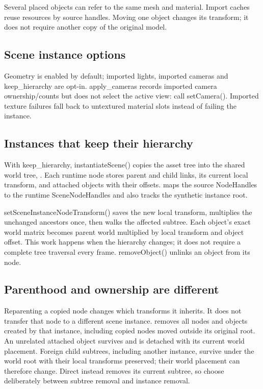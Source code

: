 \documentclass[11pt,a4paper]{article}
\begin{document}
Several placed objects can refer to the same mesh and material. Import caches reuse resources by source handles. Moving one object changes its transform; it does not require another copy of the original model.

\subsection*{Scene instance options}
Geometry is enabled by default; imported lights, imported cameras and keep\_hierarchy are opt-in. apply\_cameras records imported camera ownership/counts but does not select the active view: call setCamera(). Imported texture failures fall back to untextured material slots instead of failing the instance.

\subsection*{Instances that keep their hierarchy}
With keep\_hierarchy, instantiateScene() copies the asset tree into the shared world tree, . Each runtime node stores parent and child links, its current local transform, and attached objects with their offsets.  maps the source NodeHandles to the runtime SceneNodeHandles and also tracks the synthetic instance root.

setSceneInstanceNodeTransform() saves the new local transform, multiplies the unchanged ancestors once, then walks the affected subtree. Each object's exact world matrix becomes parent world multiplied by local transform and object offset. This work happens when the hierarchy changes; it does not require a complete tree traversal every frame. removeObject() unlinks an object from its node.

\clearpage
\subsection*{Parenthood and ownership are different}
Reparenting a copied node changes which transforms it inherits. It does not transfer that node to a different scene instance.  removes all nodes and objects created by that instance, including copied nodes moved outside its original root. An unrelated attached object survives and is detached with its current world placement. Foreign child subtrees, including another instance, survive under the world root with their local transforms preserved; their world placement can therefore change. Direct  instead removes its current subtree, so choose deliberately between subtree removal and instance removal.
\end{document}
